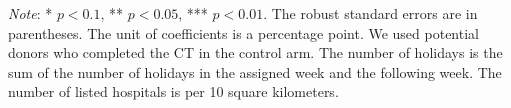 \documentclass[12pt, a4paper]{article}
\begin{document}
\begin{table}[H]
\begin{threeparttable}
\begin{tabular}[t]{lcccc}
\bottomrule
\end{tabular}
\begin{tablenotes}
\item \emph{Note}: * $p < 0.1$, ** $p < 0.05$, *** $p < 0.01$. The robust standard errors are in parentheses. The unit of coefficients is a percentage point. We used potential donors who completed the CT in the control arm. The number of holidays is the sum of the number of holidays in the assigned week and the following week. The number of listed hospitals is per 10 square kilometers.
\end{tablenotes}
\end{threeparttable}
\end{table}

\clearpage


\end{document}
